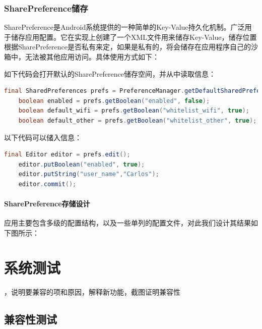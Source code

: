 \documentclass[format=final, language=chinese, degree=fyp]{hustthesis}
\begin{document}
\subsection{SharePreference储存}

SharePreference是Android系统提供的一种简单的Key-Value持久化机制。广泛用于储存应用配置。它在实现上创建了一个XML文件用来储存Key-Value，储存位置根据SharePreference是否私有来定，如果是私有的，将会储存在应用程序自己的沙箱中，无法被其他应用访问。具体使用方式如下：

如下代码会打开默认的SharePreference储存空间，并从中读取信息：

\begin{lstlisting}[language=java]
    final SharedPreferences prefs = PreferenceManager.getDefaultSharedPreferences(this);
    boolean enabled = prefs.getBoolean("enabled", false);
    boolean default_wifi = prefs.getBoolean("whitelist_wifi", true);
    boolean default_other = prefs.getBoolean("whitelist_other", true);
\end{lstlisting}

以下代码可以储入信息：

\begin{lstlisting}[language=java]
    final Editor editor = prefs.edit();
    editor.putBoolean("enabled", true);
    editor.putString("user_name","Carlos");
    editor.commit();
\end{lstlisting}

\subsubsection{SharePreference存储设计}

应用主要包含多级的配置结构，以及一些单列的配置文件，对此我们设计其结果如下图所示：



\chapter{系统测试}

，说明要兼容的项和原因，解释新功能，截图证明兼容性

\section{兼容性测试}
\end{document}
